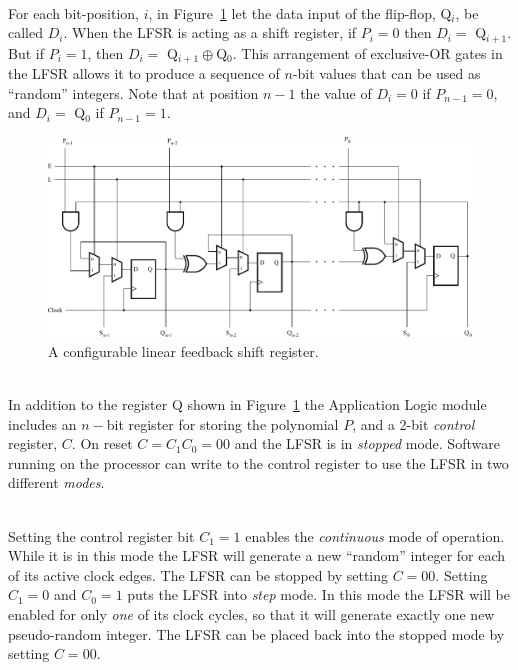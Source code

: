 \documentclass[epsfig,10pt,fullpage]{article}
\begin{document}
~\\
\noindent
For each bit-position, $i$, in Figure~\ref{fig:lfsr} 
let the data input of the flip-flop, Q$_i$, be called $D_i$.
When the LFSR is acting as a shift register, if $P_i = 0$ then 
$D_i = $ Q$_{i+1}$. But if $P_i = 1$, then $D_i = $ Q$_{i+1} \oplus $Q$_0$. This arrangement
of exclusive-OR gates in the LFSR allows it to produce a sequence of $n$-bit 
values that can be used as ``random'' integers. Note that at position $n-1$ the value of
$D_i = 0$ if $P_{n-1} = 0$, and $D_i = $ Q$_0$ if $P_{n-1} = 1$.  

\begin{figure}
   \begin{center}
       \includegraphics[scale=1.0]{figures/lfsr.pdf}
   \end{center}
   \caption{A configurable linear feedback shift register.}
	\label{fig:lfsr}
\end{figure}

~\\
\noindent
In addition to the register Q shown in Figure~\ref{fig:lfsr} the Application Logic
module includes an $n-$bit register for storing the polynomial $P$, and a 2-bit 
{\it control} register, $C$. On reset $C = C_1 C_0 = 00$ and the LFSR is in {\it stopped} mode.
Software running on the processor can write to the control 
register to use the LFSR in two different {\it modes}. 

~\\
\noindent
Setting the control register bit $C_1 = 1$ enables the {\it continuous} 
mode of operation. While it is in this mode 
the LFSR will generate a new ``random'' integer for each of its active clock edges. 
The LFSR can be stopped by setting $C = 00$. Setting $C_1 = 0$ and $C_0 = 1$ puts the 
LFSR into {\it step} mode. In this mode the LFSR will be enabled for only {\it one} of its 
clock cycles, so that it will generate exactly one new pseudo-random integer. The LFSR can 
be placed back into the stopped mode by setting $C = 00$. 
\end{document}
